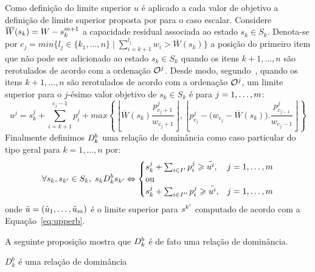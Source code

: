 Como definição do limite superior $u$ é aplicado a cada valor de objetivo
a definição de limite superior proposta por \cite{martello1990knapsack} para o caso escalar.
Considere $\overline{W}(s_k) = W - s_k^{m+1}$ a capacidade residual associada
ao estado $s_k \in S_k$.
Denota-se por
$c_j = min\big\{l_j \in \{k_1, \ldots, n\} \; \big| \; \sum_{i=k+1}^{l_j} w_i > \overline{W}(s_k)\big\}$
a posição do primeiro item que não pode ser adicionado ao estado $s_k \in S_k$
quando os itens $k+1, \ldots, n$ são rerotulados de acordo com a ordenação $\mathcal{O}^j$.
Desde modo, segundo~\cite{martello1990knapsack}, quando os itens $k+1, \ldots, n$
são rerotulados de acordo com a ordenação $\mathcal{O}^j$, um limite superior
para o $j$-ésimo valor objetivo de $s_k \in S_k$ é para $j = 1, \ldots, m$:
\begin{equation}
  u^j = s_k^j + \sum_{i=k+1}^{c_j-1} p_i^j +
    max\left\{ \left\lfloor\overline{W}(s_k)\frac{p^j_{c_j+1}}{w_{c_j+1}} \right\rfloor ,
     \left\lfloor p^j_{c_j} - \big(w_{c_j} - \overline{W}(s_k)\big).\frac{p^j_{c_{j-1}}}{w_{c_j-1}}
     \right\rfloor \right\}
  \label{eq:upperb}
\end{equation}
Finalmente definimos $D_k^{b}$ uma relação de dominância como caso particular
do tipo geral para $k = 1, \ldots, n$ por:
\begin{displaymath}
  \forall s_k, s_{{k'}} \in S_k, \; s_k D_k^{b} s_{{k'}}
    \Leftrightarrow
    \begin{cases}
      s_k^j + \sum_{i \in I'} p_i^j \geqslant \tilde{u^i}, & j = 1, \ldots, m \\
      \text{ou} \\
      s_k^j + \sum_{i \in I''} p_i^j \geqslant \tilde{u^i}, & j = 1, \ldots, m
    \end{cases}
\end{displaymath}
onde $\tilde{u} = (\tilde{u}_1, \ldots, \tilde{u}_m)$ é o limite superior
para $s^{{k'}}$ computado de acordo com a Equação~\ref{eq:upperb}.

A seguinte proposição mostra que $D_k^{b}$ é de fato uma relação de dominância.
\begin{myprop}[Relação $D_k^b$]
  \noindent
  $D_k^b$ é uma relação de dominância
\end{myprop}

